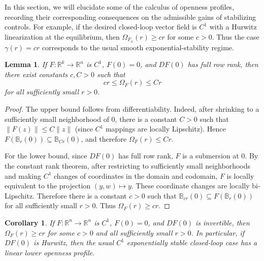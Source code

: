 \documentclass[pdflatex,sn-mathphys-num]{sn-jnl}%
\theoremstyle{thmstyleone}%
\newtheorem{lemma}[theorem]{Lemma}
\newtheorem{corollary}[theorem]{Corollary}
\theoremstyle{thmstyletwo}%
\theoremstyle{thmstylethree}%
\begin{document}
    In this section, we will elucidate some of the calculus of openness profiles, recording their corresponding consequences on the admissible gains of stabilizing controls.  For example, if the desired closed-loop vector field is $C^1$ with a Hurwitz linearization at the equilibrium, then $\Omega_{F_u}(r)\geq cr$ for some $c>0$. Thus the case $\gamma(r)=cr$ corresponds to the usual smooth exponential-stability regime.


    \begin{lemma}\label{linear openness profile}
        If $F:\mathbb{R}^{k}\to\mathbb{R}^{n}$ is $C^1$, $F(0)=0$, and $DF(0)$ has full row rank, then there exist constants $c,C>0$ such that
        $$
            cr\leq \Omega_F(r)\leq Cr
        $$
        for all sufficiently small $r>0$.
    \end{lemma}


    \begin{proof}
        The upper bound follows from differentiability.  Indeed, after shrinking to a sufficiently small neighborhood of $0$, there is a constant $C>0$ such that $\|F(z)\|\leq C\|z\|$ (since $C^1$ mappings are locally Lipschitz).  Hence $F(\mathbb{B}_r(0))\subseteq \mathbb{B}_{Cr}(0)$, and therefore $\Omega_F(r)\leq Cr$.

        For the lower bound, since $DF(0)$ has full row rank, $F$ is a submersion at $0$.  By the constant rank theorem, after restricting to sufficiently small neighborhoods and making $C^1$ changes of coordinates in the domain and codomain, $F$ is locally equivalent to the projection $(y,w)\mapsto y$.  These coordinate changes are locally bi-Lipschitz.  Therefore there is a constant $c>0$ such that $\mathbb{B}_{cr}(0)\subseteq F(\mathbb{B}_r(0))$ for all sufficiently small $r>0$.  Thus $\Omega_F(r)\geq cr$.
    \end{proof}
    


    \begin{corollary}\label{hurwitz gives linear profile}
        If $F:\mathbb{R}^{n}\to\mathbb{R}^{n}$ is $C^1$, $F(0)=0$, and $DF(0)$ is invertible, then $\Omega_F(r)\geq cr$ for some $c>0$ and all sufficiently small $r>0$.  In particular, if $DF(0)$ is Hurwitz, then the usual $C^1$ exponentially stable closed-loop case has a linear lower openness profile.
    \end{corollary}
\end{document}
